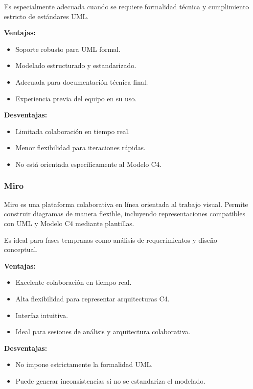 \documentclass[12pt]{article}
\begin{document}
Es especialmente adecuada cuando se requiere formalidad técnica y cumplimiento estricto de estándares UML.

\textbf{Ventajas:}
\begin{itemize}
    \item Soporte robusto para UML formal.
    \item Modelado estructurado y estandarizado.
    \item Adecuada para documentación técnica final.
    \item Experiencia previa del equipo en su uso.
\end{itemize}

\textbf{Desventajas:}
\begin{itemize}
    \item Limitada colaboración en tiempo real.
    \item Menor flexibilidad para iteraciones rápidas.
    \item No está orientada específicamente al Modelo C4.
\end{itemize}

\subsubsection{Miro}

Miro es una plataforma colaborativa en línea orientada al trabajo visual. Permite construir diagramas de manera flexible, incluyendo representaciones compatibles con UML y Modelo C4 mediante plantillas.

Es ideal para fases tempranas como análisis de requerimientos y diseño conceptual.

\textbf{Ventajas:}
\begin{itemize}
    \item Excelente colaboración en tiempo real.
    \item Alta flexibilidad para representar arquitecturas C4.
    \item Interfaz intuitiva.
    \item Ideal para sesiones de análisis y arquitectura colaborativa.
\end{itemize}

\textbf{Desventajas:}
\begin{itemize}
    \item No impone estrictamente la formalidad UML.
    \item Puede generar inconsistencias si no se estandariza el modelado.
\end{itemize}
\end{document}

